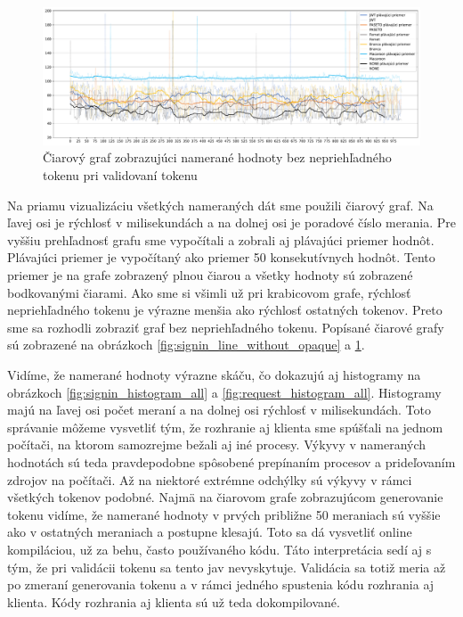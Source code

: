 \begin{figure}[H]
  \centerline{\includegraphics[width=1\textwidth]{images/request_line_without_opaque}}
  \caption[Čiarový graf -- validácia, hodnoty bez nepriehľadného tokenu]{Čiarový graf zobrazujúci namerané hodnoty bez nepriehľadného tokenu pri validovaní tokenu}
  \label{fig:request_line_without_opaque}
\end{figure}

Na priamu vizualizáciu všetkých nameraných dát sme použili čiarový graf. Na ľavej osi je rýchlosť v milisekundách a na dolnej osi je poradové číslo merania. Pre vyššiu prehľadnosť grafu sme vypočítali a zobrali aj plávajúci priemer hodnôt. Plávajúci priemer je vypočítaný ako priemer 50 konsekutívnych hodnôt. Tento priemer je na grafe zobrazený plnou čiarou a všetky hodnoty sú zobrazené bodkovanými čiarami. Ako sme si všimli už pri krabicovom grafe, rýchlosť nepriehľadného tokenu je výrazne menšia ako rýchlosť ostatných tokenov. Preto sme sa rozhodli zobraziť graf bez nepriehľadného tokenu. Popísané čiarové grafy sú zobrazené na obrázkoch \ref{fig:signin_line_without_opaque} a \ref{fig:request_line_without_opaque}.


Vidíme, že namerané hodnoty výrazne skáču, čo dokazujú aj histogramy na obrázkoch \ref{fig:signin_histogram_all} a \ref{fig:request_histogram_all}. Histogramy majú na ľavej osi počet meraní a na dolnej osi rýchlosť v milisekundách. Toto správanie môžeme vysvetliť tým, že rozhranie aj klienta sme spúšťali na jednom počítači, na ktorom samozrejme bežali aj iné procesy. Výkyvy v nameraných hodnotách sú teda pravdepodobne spôsobené prepínaním procesov a prideľovaním zdrojov na počítači. Až na niektoré extrémne odchýlky sú výkyvy v rámci všetkých tokenov podobné. Najmä na čiarovom grafe zobrazujúcom generovanie tokenu vidíme, že namerané hodnoty v prvých približne 50 meraniach sú vyššie ako v ostatných meraniach a postupne klesajú. Toto sa dá vysvetliť online kompiláciou, už za behu, často používaného kódu. Táto interpretácia sedí aj s tým, že pri validácii tokenu sa tento jav nevyskytuje. Validácia sa totiž meria až po zmeraní generovania tokenu a v rámci jedného spustenia kódu rozhrania aj klienta. Kódy rozhrania aj klienta sú už teda dokompilované.


